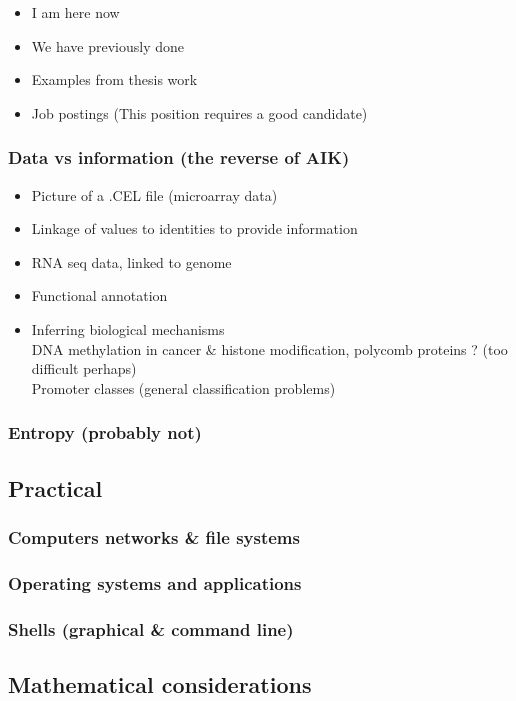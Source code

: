 \documentclass{scrartcl}
\begin{document}
\begin{itemize}
\item I am here now
\item We have previously done
\item Examples from thesis work
\item Job postings (This position requires a good candidate)
\end{itemize}
\subsubsection{Data vs information (the reverse of AIK)}
\label{sec-3-1-4}

\begin{itemize}
\item Picture of a .CEL file (microarray data)
\item Linkage of values to identities to provide information
\item RNA seq data, linked to genome
\item Functional annotation
\item Inferring biological mechanisms\\
DNA methylation in cancer \& histone modification, polycomb proteins ? (too difficult perhaps)\\
  Promoter classes (general classification problems)
\end{itemize}
\subsubsection{Entropy (probably not)}
\label{sec-3-1-5}
\subsection{Practical}
\label{sec-3-2}
\subsubsection{Computers networks \& file systems}
\label{sec-3-2-1}
\subsubsection{Operating systems and applications}
\label{sec-3-2-2}
\subsubsection{Shells (graphical \& command line)}
\label{sec-3-2-3}
\subsection{Mathematical considerations}
\label{sec-3-3}
\end{document}
